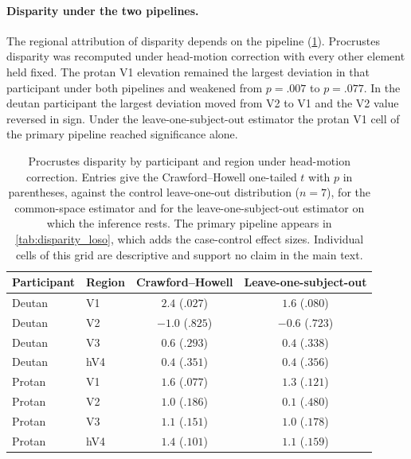 \paragraph{Disparity under the two pipelines.}
The regional attribution of disparity depends on the pipeline (\cref{tab:motion_arms}). Procrustes disparity was recomputed under head-motion correction with every other element held fixed. The protan V1 elevation remained the largest deviation in that participant under both pipelines and weakened from $p = .007$ to $p = .077$. In the deutan participant the largest deviation moved from V2 to V1 and the V2 value reversed in sign. Under the leave-one-subject-out estimator the protan V1 cell of the primary pipeline reached significance alone.

\begin{table}[h]
\centering
\caption{Procrustes disparity by participant and region under head-motion correction. Entries give the Crawford--Howell one-tailed $t$ with $p$ in parentheses, against the control leave-one-out distribution ($n = 7$), for the common-space estimator and for the leave-one-subject-out estimator on which the inference rests. The primary pipeline appears in \cref{tab:disparity_loso}, which adds the case-control effect sizes. Individual cells of this grid are descriptive and support no claim in the main text.}
\label{tab:motion_arms}
\small
\begin{tabular}{llcc}
\toprule
Participant & Region & Crawford--Howell & Leave-one-subject-out \\
\midrule
Deutan & V1  & $2.4$ ($.027$) & $1.6$ ($.080$) \\
Deutan & V2  & $-1.0$ ($.825$) & $-0.6$ ($.723$) \\
Deutan & V3  & $0.6$ ($.293$) & $0.4$ ($.338$) \\
Deutan & hV4 & $0.4$ ($.351$) & $0.4$ ($.356$) \\
Protan & V1  & $1.6$ ($.077$) & $1.3$ ($.121$) \\
Protan & V2  & $1.0$ ($.186$) & $0.1$ ($.480$) \\
Protan & V3  & $1.1$ ($.151$) & $1.0$ ($.178$) \\
Protan & hV4 & $1.4$ ($.101$) & $1.1$ ($.159$) \\
\bottomrule
\end{tabular}
\end{table}

